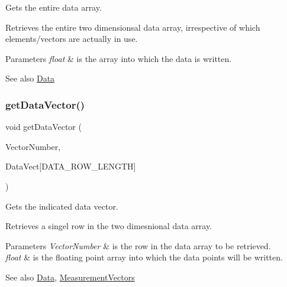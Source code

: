 Gets the entire data array. 

Retrieves the entire two dimensionsal data array, irrespective of which elements/vectors are actually in use. 
\begin{DoxyParams}{Parameters}
{\em float} & is the array into which the data is written. \\
\hline
\end{DoxyParams}
\begin{DoxySeeAlso}{See also}
\mbox{\hyperlink{struct_data}{Data}} 
\end{DoxySeeAlso}
\mbox{\label{class_data_source_a924875bd657b56f140604551270cdbc0}} 
\subsubsection{\texorpdfstring{getDataVector()}{getDataVector()}}
{\footnotesize\ttfamily void get\+Data\+Vector (\begin{DoxyParamCaption}\item[{const \mbox{\hyperlink{_s_p_i___instruction_set_8h_a9d8048399836e11887f85cc8dc3d75d5}{Measurement\+Vectors}}}]{Vector\+Number,  }\item[{float}]{Data\+Vect\mbox{[}\+D\+A\+T\+A\+\_\+\+R\+O\+W\+\_\+\+L\+E\+N\+G\+T\+H\mbox{]} }\end{DoxyParamCaption})}



Gets the indicated data vector. 

Retrieves a singel row in the two dimesnional data array. 
\begin{DoxyParams}{Parameters}
{\em Vector\+Number} & is the row in the data array to be retrieved. \\
\hline
{\em float} & is the floating point array into which the data points will be written. \\
\hline
\end{DoxyParams}
\begin{DoxySeeAlso}{See also}
\mbox{\hyperlink{struct_data}{Data}}, \mbox{\hyperlink{_s_p_i___instruction_set_8h_a9d8048399836e11887f85cc8dc3d75d5}{Measurement\+Vectors}} 
\end{DoxySeeAlso}
\mbox{\label{class_data_source_ac15f241362d7c22c75c42c2bb16315bf}} 

